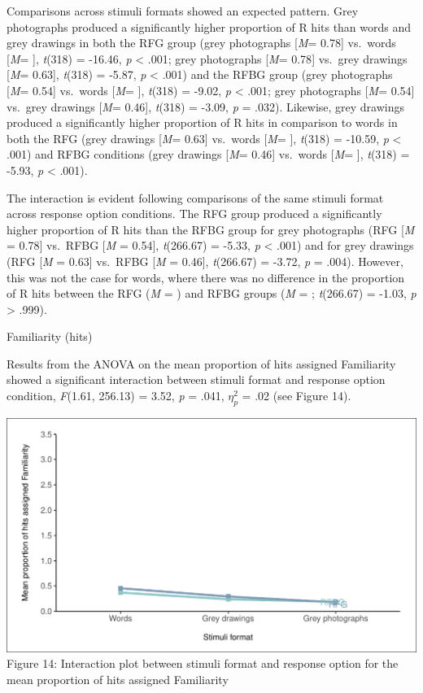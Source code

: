 \documentclass[
  11pt,
]{article}
\begin{document}
Comparisons across stimuli formats showed an expected pattern. Grey
photographs produced a significantly higher proportion of R hits than
words and grey drawings in both the RFG group (grey photographs
{[}\emph{M}= 0.78{]} vs.~words {[}\emph{M}= {]}, \emph{t}(318) = -16.46,
\emph{p} \textless{} .001; grey photographs {[}\emph{M}= 0.78{]}
vs.~grey drawings {[}\emph{M}= 0.63{]}, \emph{t}(318) = -5.87, \emph{p}
\textless{} .001) and the RFBG group (grey photographs {[}\emph{M}=
0.54{]} vs.~words {[}\emph{M}= {]}, \emph{t}(318) = -9.02, \emph{p}
\textless{} .001; grey photographs {[}\emph{M}= 0.54{]} vs.~grey
drawings {[}\emph{M}= 0.46{]}, \emph{t}(318) = -3.09, \emph{p} = .032).
Likewise, grey drawings produced a significantly higher proportion of R
hits in comparison to words in both the RFG (grey drawings {[}\emph{M}=
0.63{]} vs.~words {[}\emph{M}= {]}, \emph{t}(318) = -10.59, \emph{p}
\textless{} .001) and RFBG conditions (grey drawings {[}\emph{M}=
0.46{]} vs.~words {[}\emph{M}= {]}, \emph{t}(318) = -5.93, \emph{p}
\textless{} .001).

The interaction is evident following comparisons of the same stimuli
format across response option conditions. The RFG group produced a
significantly higher proportion of R hits than the RFBG group for grey
photographs (RFG {[}\emph{M} = 0.78{]} vs.~RFBG {[}\emph{M} = 0.54{]},
\emph{t}(266.67) = -5.33, \emph{p} \textless{} .001) and for grey
drawings (RFG {[}\emph{M} = 0.63{]} vs.~RFBG {[}\emph{M} = 0.46{]},
\emph{t}(266.67) = -3.72, \emph{p} = .004). However, this was not the
case for words, where there was no difference in the proportion of R
hits between the RFG (\emph{M} = ) and RFBG groups (\emph{M} = ;
\emph{t}(266.67) = -1.03, \emph{p} \textgreater{} .999).

Familiarity (hits)

Results from the ANOVA on the mean proportion of hits assigned
Familiarity showed a significant interaction between stimuli format and
response option condition, \emph{F}(1.61, 256.13) = 3.52, \emph{p} =
.041, \(\eta^2_p\) = .02 (see Figure 14).

\includegraphics{R--Thesis_files/figure-latex/unnamed-chunk-38-1.pdf}
Figure 14: Interaction plot between stimuli format and response option
for the mean proportion of hits assigned Familiarity ~~
\end{document}
